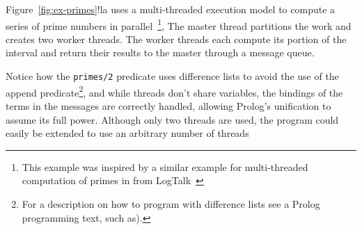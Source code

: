 Figure~\ref{fig:ex-primes}!la
 uses a multi-threaded execution model to
compute a series of prime numbers in parallel~\footnote{This example
  was inspired by a similar example for multi-threaded computation of
  primes in from LogTalk~\cite{log-man}}, The master thread partitions
the work and creates two worker threads.  The worker threads each
compute its portion of the interval and return their results to the
master through a message queue.

Notice how the \texttt{primes/2} predicate uses difference lists to
avoid the use of the append predicate\footnote{For a description on
  how to program with difference lists see a Prolog programming text,
  such as\cite{StSh86}).}, and while threads don't share variables,
the bindings of the terms in the messages are correctly handled,
allowing Prolog's unification to assume its full power.  Although only
two threads are used, the program could easily be extended to use an
arbitrary number of threads

